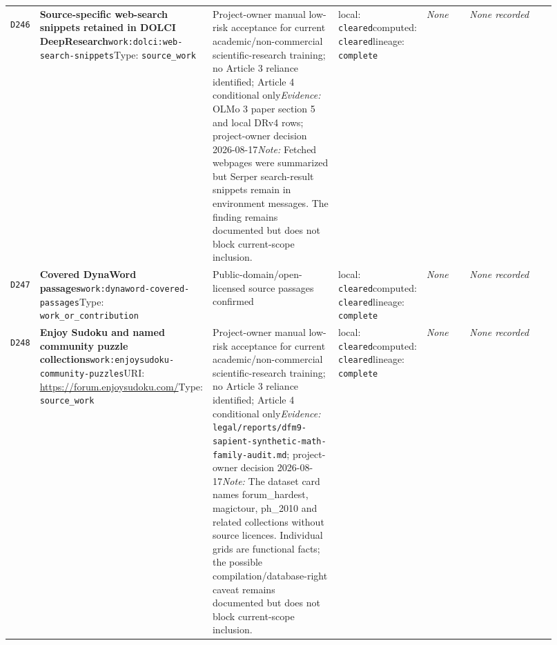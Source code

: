 \documentclass[9pt,a4paper]{article}
\newcommand{\depid}[1]{\hypertarget{dep:#1}{\texttt{#1}}}
\begin{document}
\begin{landscape}
\begin{longtable}{@{}L{0.035\linewidth}L{0.185\linewidth}L{0.27\linewidth}L{0.09\linewidth}L{0.10\linewidth}L{0.24\linewidth}@{}}
\depid{D246} & \textbf{Source-specific web-search snippets retained in DOLCI DeepResearch}\newline \nolinkurl{work:dolci:web-search-snippets}\newline Type: \texttt{source\_work} & Project-owner manual low-risk acceptance for current academic/non-commercial scientific-research training; no Article 3 reliance identified; Article 4 conditional only\newline \textit{Evidence:} OLMo 3 paper section 5 and local DRv4 rows; project-owner decision 2026-08-17\newline \textit{Note:} Fetched webpages were summarized but Serper search-result snippets remain in environment messages. The finding remains documented but does not block current-scope inclusion. & local: \texttt{cleared}\newline computed: \texttt{cleared}\newline lineage: \texttt{complete} & \textit{None} & \textit{None recorded} \\
\depid{D247} & \textbf{Covered DynaWord passages}\newline \nolinkurl{work:dynaword-covered-passages}\newline Type: \texttt{work\_or\_contribution} & Public-domain/open-licensed source passages confirmed & local: \texttt{cleared}\newline computed: \texttt{cleared}\newline lineage: \texttt{complete} & \textit{None} & \textit{None recorded} \\
\depid{D248} & \textbf{Enjoy Sudoku and named community puzzle collections}\newline \nolinkurl{work:enjoysudoku-community-puzzles}\newline URI: \url{https://forum.enjoysudoku.com/}\newline Type: \texttt{source\_work} & Project-owner manual low-risk acceptance for current academic/non-commercial scientific-research training; no Article 3 reliance identified; Article 4 conditional only\newline \textit{Evidence:} \nolinkurl{legal/reports/dfm9-sapient-synthetic-math-family-audit.md}; project-owner decision 2026-08-17\newline \textit{Note:} The dataset card names forum\_hardest, magictour, ph\_2010 and related collections without source licences. Individual grids are functional facts; the possible compilation/database-right caveat remains documented but does not block current-scope inclusion. & local: \texttt{cleared}\newline computed: \texttt{cleared}\newline lineage: \texttt{complete} & \textit{None} & \textit{None recorded} \\

\end{longtable}
\end{landscape}
\end{document}
